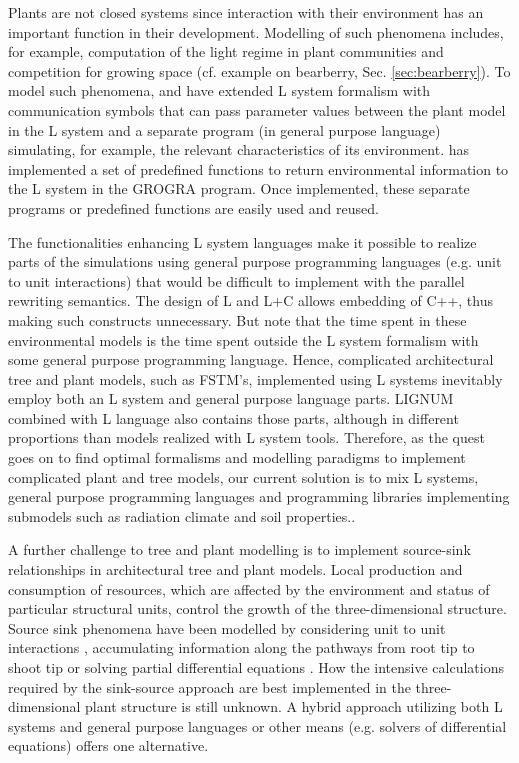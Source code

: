 Plants are not closed systems since interaction with their environment
has  an important function  in their  development.  Modelling  of such
phenomena includes,  for example, computation  of the light  regime in
plant communities  and competition for growing space  (cf.  example on
bearberry,  Sec.   \ref{sec:bearberry}).   To  model  such  phenomena,
\citet{mech:97} and  \citet{mech:96} have extended  L system formalism
with communication symbols that  can pass parameter values between the
plant model in the L system and a separate program (in general purpose
language) simulating, for example, the relevant characteristics of its
environment.   \citet{kurth:94} has  implemented a  set  of predefined
functions to return  environmental information to the L  system in the
GROGRA  program.    Once  implemented,  these   separate  programs  or
predefined functions are easily used and reused.

The functionalities  enhancing L system languages make  it possible to
realize  parts of  the simulations  using general  purpose programming
languages (e.g.  unit to unit interactions) that would be difficult to
implement with the parallel rewriting  semantics.  The design of L and
L+C allows embedding of  C++, thus making such constructs unnecessary.
But note that the time spent in these environmental models is the time
spent  outside  the  L  system  formalism with  some  general  purpose
programming language.  Hence, complicated architectural tree and plant
models, such as FSTM's,  implemented using L systems inevitably employ
both an L system and  general purpose language parts.  LIGNUM combined
with  L language  also  contains those  parts,  although in  different
proportions than  models realized with L system  tools.  Therefore, as
the quest goes  on to find optimal formalisms  and modelling paradigms
to implement  complicated plant and tree models,  our current solution
is  to  mix  L  systems,  general purpose  programming  languages  and
programming libraries implementing submodels such as radiation climate
and soil properties..
 
A  further challenge  to  tree  and plant  modelling  is to  implement
source-sink  relationships  in architectural  tree  and plant  models.
Local production  and consumption of resources, which  are affected by
the environment and status of particular structural units, control the
growth of the three-dimensional structure.  Source sink phenomena have
been   modelled    by   considering   unit    to   unit   interactions
\citep{balandier:00}, accumulating information along the pathways from
root  tip   to  shoot  tip  \citep{dereffye:97}   or  solving  partial
differential  equations  \citep{deleuze:97,  palovaara:03}.   How  the
intensive calculations  required by the sink-source  approach are best
implemented in the three-dimensional plant structure is still unknown.
A  hybrid  approach  utilizing  both  L systems  and  general  purpose
languages  or other  means (e.g.   solvers of  differential equations)
offers one alternative.

